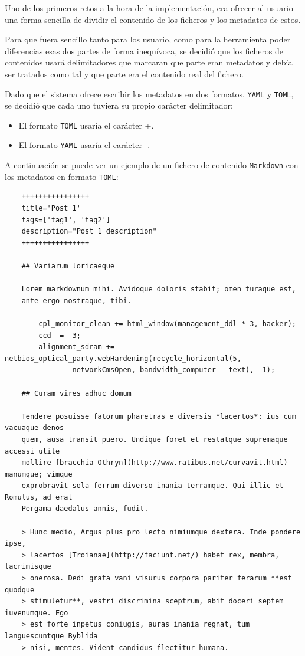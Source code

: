 Uno de los primeros retos a la hora de la implementación, era ofrecer al usuario una forma sencilla de dividir
el contenido de los ficheros y los metadatos de estos.

Para que fuera sencillo tanto para los usuario, como para la herramienta poder diferencias esas dos partes
de forma inequívoca, se decidió que los ficheros de contenidos usará delimitadores que marcaran que
parte eran metadatos y debía ser tratados como tal y que parte era el contenido real del fichero.

Dado que el sistema ofrece escribir los metadatos en dos formatos, \texttt{YAML} y \texttt{TOML}, se decidió que cada
uno tuviera su propio carácter delimitador:

\begin{itemize}
    \item El formato \texttt{TOML} usaría el carácter +.
    \item El formato \texttt{YAML} usaría el carácter -.
\end{itemize}

A continuación se puede ver un ejemplo de un fichero de contenido \texttt{Markdown} con los metadatos en formato
\texttt{TOML}:

\begin{verbatim}
    ++++++++++++++++
    title='Post 1'
    tags=['tag1', 'tag2']
    description="Post 1 description"
    ++++++++++++++++

    ## Variarum loricaeque

    Lorem markdownum mihi. Avidoque doloris stabit; omen turaque est, 
    ante ergo nostraque, tibi.

        cpl_monitor_clean += html_window(management_ddl * 3, hacker);
        ccd -= -3;
        alignment_sdram += netbios_optical_party.webHardening(recycle_horizontal(5,
                networkCmsOpen, bandwidth_computer - text), -1);

    ## Curam vires adhuc domum

    Tendere posuisse fatorum pharetras e diversis *lacertos*: ius cum vacuaque denos
    quem, ausa transit puero. Undique foret et restatque supremaque accessi utile
    mollire [bracchia Othryn](http://www.ratibus.net/curvavit.html) manumque; vimque
    exprobravit sola ferrum diverso inania terramque. Qui illic et Romulus, ad erat
    Pergama daedalus annis, fudit.

    > Hunc medio, Argus plus pro lecto nimiumque dextera. Inde pondere ipse,
    > lacertos [Troianae](http://faciunt.net/) habet rex, membra, lacrimisque
    > onerosa. Dedi grata vani visurus corpora pariter ferarum **est quodque
    > stimuletur**, vestri discrimina sceptrum, abit doceri septem iuvenumque. Ego
    > est forte inpetus coniugis, auras inania regnat, tum languescuntque Byblida
    > nisi, mentes. Vident candidus flectitur humana.
\end{verbatim}

